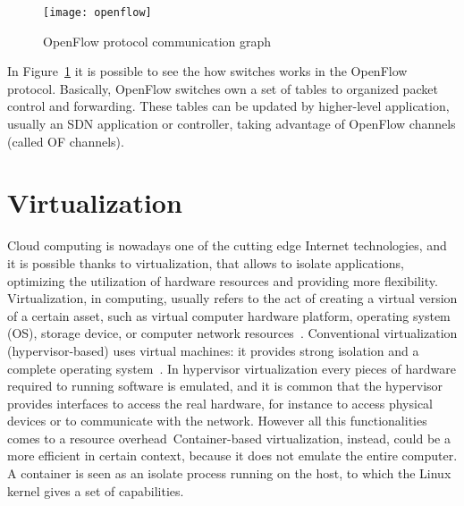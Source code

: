 \begin{figure}[t]
 \centering
 \texttt{[image: openflow]}
 \caption{OpenFlow protocol communication graph}
 \label{chap:background:img:openflow_protocol}
\end{figure}

In Figure~\ref{chap:background:img:openflow_protocol} it is possible to see the
how switches works in the OpenFlow protocol. Basically, OpenFlow switches own a
set of tables to organized packet control and forwarding. These tables can be
updated by higher-level application, usually an SDN application or controller,
taking advantage of OpenFlow channels (called OF channels). 

\section{Virtualization}
Cloud computing is nowadays one of the cutting edge Internet technologies, and
it is possible thanks to virtualization, that allows to isolate applications,
optimizing the utilization of hardware resources and providing more flexibility.
Virtualization, in computing, usually refers to the act of creating a virtual
version of a certain asset, such as virtual computer hardware platform,
operating system (OS), storage device, or computer network
resources~\cite{liu2014research}. Conventional virtualization
(hypervisor-based) uses virtual machines: it provides strong isolation and a
complete operating system~\cite{eder2016hypervisor}. In hypervisor
virtualization every pieces of hardware required to running software is
emulated, and it is common that the hypervisor provides interfaces to access
the real hardware, for instance to access physical devices or to communicate
with the network. However all this functionalities comes to a resource
overhead~\cite{scheepers2014virtualization}Container-based virtualization,
instead, could be a more efficient in certain context, because it does not
emulate the entire computer. A container is seen as an isolate process running
on the host, to which the Linux kernel gives a set of capabilities.

